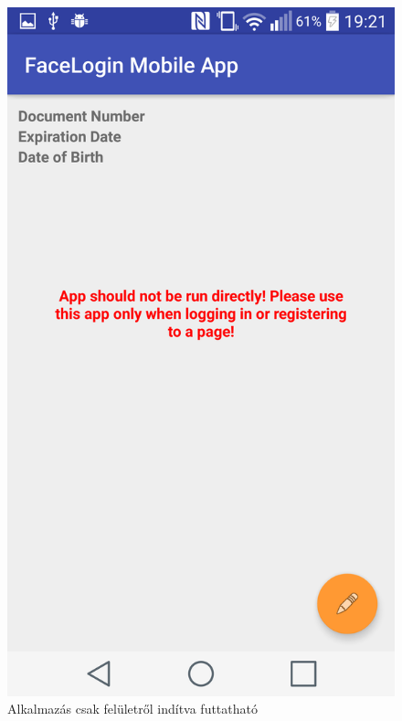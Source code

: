 \begin{figure}[h]
 \begin{minipage}{.50\textwidth} 
\centering
    \includegraphics[scale=0.10]{img/app_should_not_be_run_directly}
    \caption{Alkalmazás csak felületről indítva futtatható}
 \end{minipage}
 \begin{minipage}{.50\textwidth} 
\centering

\end{minipage}
\end{figure}
